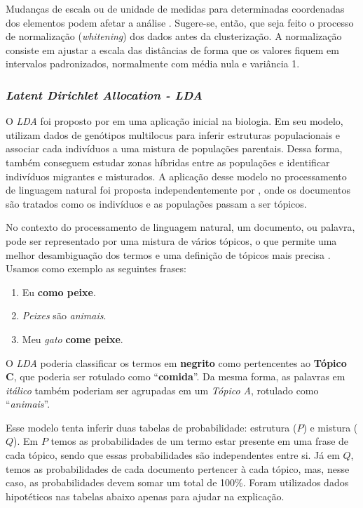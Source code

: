 Mudanças de escala ou de unidade de medidas para determinadas coordenadas dos elementos podem afetar a análise \cite{cole1998}. Sugere-se, então, que seja feito o processo de normalização (\textit{whitening}) dos dados antes da clusterização. A normalização consiste em ajustar a escala das distâncias de forma que os valores fiquem em intervalos padronizados, normalmente com média nula e variância 1.


\subsubsection{\textit{Latent Dirichlet Allocation - LDA}}

O \textit{LDA} foi proposto por  em uma aplicação inicial na biologia. Em seu modelo,  utilizam dados de genótipos multilocus para inferir estruturas populacionais e associar cada indivíduos a uma mistura de populações parentais. Dessa forma, também conseguem estudar zonas híbridas entre as populações e identificar indivíduos migrantes e misturados. A aplicação desse modelo no processamento de linguagem natural foi proposta independentemente por , onde os documentos são tratados como os indivíduos e as populações passam a ser tópicos.

No contexto do processamento de linguagem natural, um documento, ou palavra, pode ser representado por uma mistura de vários tópicos, o que permite uma melhor desambiguação dos termos e uma definição de tópicos mais precisa \cite{girolami}. Usamos como exemplo as seguintes frases:

\begin{enumerate}
  \item Eu \textbf{como peixe}.
  \item \textit{Peixes} são \textit{animais}.
  \item Meu \textit{gato} \textbf{come peixe}.
\end{enumerate}

O \textit{LDA} poderia classificar os termos em \textbf{negrito} como pertencentes ao \textbf{Tópico C}, que poderia ser rotulado como ``\textbf{comida}''. Da mesma forma, as palavras em \textit{itálico} também poderiam ser agrupadas em um \textit{Tópico A}, rotulado como ``\textit{animais}''.

Esse modelo tenta inferir duas tabelas de probabilidade: estrutura (\(P\)) e mistura (\(Q\)). Em \(P\) temos as probabilidades de um termo estar presente em uma frase de cada tópico, sendo que essas probabilidades são independentes entre si. Já em \(Q\), temos as probabilidades de cada documento pertencer à cada tópico, mas, nesse caso, as probabilidades devem somar um total de 100\%. Foram utilizados dados hipotéticos nas tabelas abaixo apenas para ajudar na explicação.

